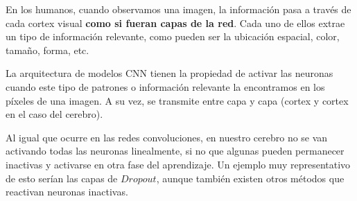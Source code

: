 \documentclass[11pt,a4paper]{article}
\begin{document}
En los humanos, cuando observamos una imagen, la información pasa a través de cada cortex visual \textbf{como si fueran capas de la red}. Cada uno de ellos extrae un tipo
de información relevante, como pueden ser la ubicación espacial, color, tamaño, forma, etc.

La arquitectura de modelos CNN tienen la propiedad de activar las neuronas cuando este tipo de patrones o información relevante la encontramos en los píxeles de una imagen.
A su vez, se transmite entre capa y capa (cortex y cortex en el caso del cerebro).

Al igual que ocurre en las redes convoluciones, en nuestro cerebro no se van activando todas las neuronas linealmente, si no que algunas pueden permanecer inactivas y activarse
en otra fase del aprendizaje. Un ejemplo muy representativo de esto serían las capas de $Dropout$, aunque también existen otros métodos que reactivan neuronas inactivas.
\end{document}
